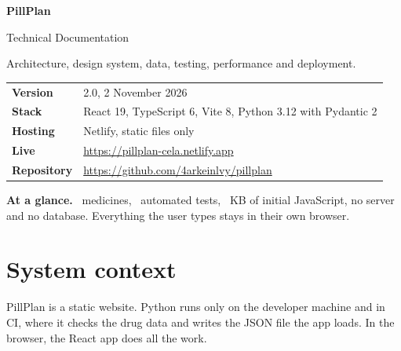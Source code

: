 \documentclass[11pt]{article}
\begin{document}
\thispagestyle{empty}
\vspace*{8mm}
{\fontsize{34}{38}\selectfont\bfseries PillPlan}\par
\vspace{2mm}
{\Large Technical Documentation}\par
\vspace{4mm}
{\color{inkmuted}Architecture, design system, data, testing, performance and deployment.}\par
\vspace{6mm}
\begin{tabular}{@{}ll@{}}
\textbf{Version} & 2.0, 2 November 2026 \\
\textbf{Stack} & React 19, TypeScript 6, Vite 8, Python 3.12 with Pydantic 2 \\
\textbf{Hosting} & Netlify, static files only \\
\textbf{Live} & \url{https://pillplan-cela.netlify.app} \\
\textbf{Repository} & \url{https://github.com/4arkeinlvy/pillplan} \\
\end{tabular}
\vspace{6mm}

\begin{note}
\textbf{At a glance.} \CatalogDrugs\ medicines, \MetricAllTests\ automated tests, \MetricInitialJsGzip\ KB of initial JavaScript, no server and no database. Everything the user types stays in their own browser.
\end{note}

\tableofcontents
\newpage

\section{System context}
PillPlan is a static website. Python runs only on the developer machine and in CI, where it checks the drug data and writes the JSON file the app loads. In the browser, the React app does all the work.
\end{document}
